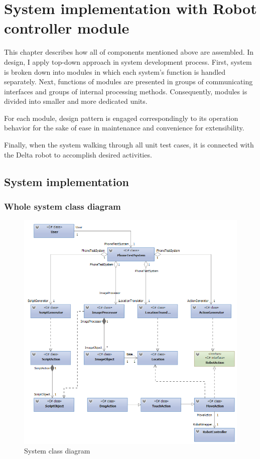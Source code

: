\chapter{System implementation with Robot controller module}
\indent This chapter describes how all of components mentioned above are assembled. In design, I apply top-down approach in system development process. First, system is broken down into modules in which each system's function is handled separately. Next, functions of modules are presented in groups of communicating interfaces and groups of internal processing methods. Consequently, modules is divided into smaller and more dedicated units.

For each module, design pattern is engaged correspondingly to its operation behavior for the sake of ease in maintenance and convenience for extensibility.

Finally, when the system walking through all unit test cases, it is connected with the Delta robot to accomplish desired activities.

\section{System implementation}
\subsection{Whole system class diagram}
    \begin{figure}[H]
		\centering
		\includegraphics[scale=0.75]{Chapters/Fig/class_diagram.png}
		\caption{System class diagram}
		\label{fig:class_diagram}
	\end{figure}

